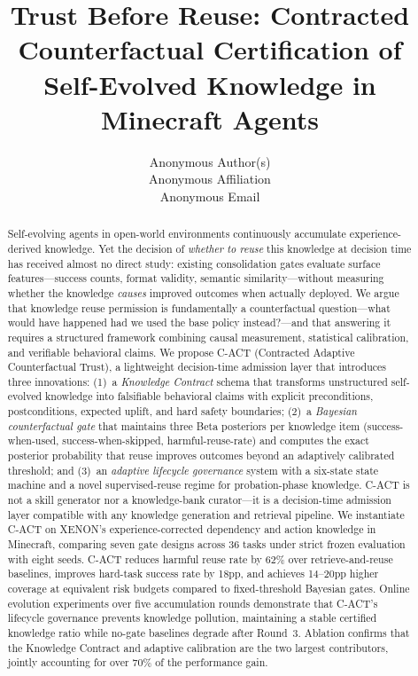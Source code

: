 \documentclass[letterpaper]{article}
\title{Trust Before Reuse: Contracted Counterfactual Certification of \\ Self-Evolved Knowledge in Minecraft Agents}
\author{
    Anonymous Author(s)\\
    Anonymous Affiliation\\
    Anonymous Email
}
\begin{document}
\maketitle

\begin{abstract}
Self-evolving agents in open-world environments continuously accumulate experience-derived knowledge. Yet the decision of \emph{whether to reuse} this knowledge at decision time has received almost no direct study: existing consolidation gates evaluate surface features---success counts, format validity, semantic similarity---without measuring whether the knowledge \emph{causes} improved outcomes when actually deployed. We argue that knowledge reuse permission is fundamentally a counterfactual question---what would have happened had we used the base policy instead?---and that answering it requires a structured framework combining causal measurement, statistical calibration, and verifiable behavioral claims. We propose \textsc{C-ACT} (Contracted Adaptive Counterfactual Trust), a lightweight decision-time admission layer that introduces three innovations: (1)~a \emph{Knowledge Contract} schema that transforms unstructured self-evolved knowledge into falsifiable behavioral claims with explicit preconditions, postconditions, expected uplift, and hard safety boundaries; (2)~a \emph{Bayesian counterfactual gate} that maintains three Beta posteriors per knowledge item (success-when-used, success-when-skipped, harmful-reuse-rate) and computes the exact posterior probability that reuse improves outcomes beyond an adaptively calibrated threshold; and (3)~an \emph{adaptive lifecycle governance} system with a six-state state machine and a novel supervised-reuse regime for probation-phase knowledge. \textsc{C-ACT} is not a skill generator nor a knowledge-bank curator---it is a decision-time admission layer compatible with any knowledge generation and retrieval pipeline. We instantiate \textsc{C-ACT} on \textsc{XENON}'s experience-corrected dependency and action knowledge in Minecraft, comparing seven gate designs across 36 tasks under strict frozen evaluation with eight seeds. \textsc{C-ACT} reduces harmful reuse rate by 62\% over retrieve-and-reuse baselines, improves hard-task success rate by 18pp, and achieves 14--20pp higher coverage at equivalent risk budgets compared to fixed-threshold Bayesian gates. Online evolution experiments over five accumulation rounds demonstrate that \textsc{C-ACT}'s lifecycle governance prevents knowledge pollution, maintaining a stable certified knowledge ratio while no-gate baselines degrade after Round~3. Ablation confirms that the Knowledge Contract and adaptive calibration are the two largest contributors, jointly accounting for over 70\% of the performance gain.
\end{abstract}
\end{document}
